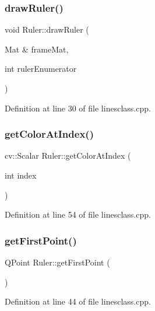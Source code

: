 \subsubsection{\texorpdfstring{drawRuler()}{drawRuler()}}
{\footnotesize\ttfamily void Ruler\+::draw\+Ruler (\begin{DoxyParamCaption}\item[{Mat \&}]{frame\+Mat,  }\item[{int}]{ruler\+Enumerator }\end{DoxyParamCaption})}



Definition at line 30 of file linesclass.\+cpp.

\mbox{\label{classRuler_ae7e524a583b89c5905d1aee2d6ecb85d}} 
\subsubsection{\texorpdfstring{getColorAtIndex()}{getColorAtIndex()}}
{\footnotesize\ttfamily cv\+::\+Scalar Ruler\+::get\+Color\+At\+Index (\begin{DoxyParamCaption}\item[{int}]{index }\end{DoxyParamCaption})}



Definition at line 54 of file linesclass.\+cpp.

\mbox{\label{classRuler_acd500bb44e0a7f79e881ae15e0a6a03a}} 
\subsubsection{\texorpdfstring{getFirstPoint()}{getFirstPoint()}}
{\footnotesize\ttfamily Q\+Point Ruler\+::get\+First\+Point (\begin{DoxyParamCaption}{ }\end{DoxyParamCaption})}



Definition at line 44 of file linesclass.\+cpp.

\mbox{\label{classRuler_a8a39371560dd77a617496fffddc47966}} 
